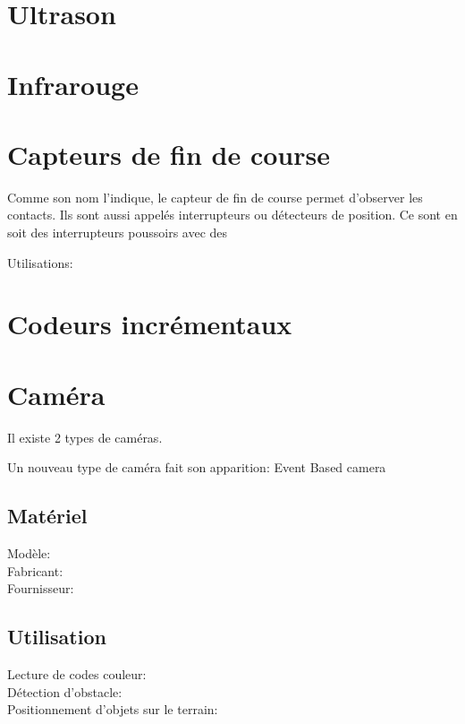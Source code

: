 \documentclass[a4paper, 11pt]{report}
\begin{document}
\section{Ultrason}

\section{Infrarouge}

\section{Capteurs de fin de course}
Comme son nom l'indique, le capteur de fin de course permet d'observer les contacts. Ils sont aussi appelés interrupteurs ou détecteurs de position. Ce sont en soit des interrupteurs poussoirs avec des 

Utilisations:

\section{Codeurs incrémentaux}

\section{Caméra}
Il existe 2 types de caméras.

Un nouveau type de caméra fait son apparition: Event Based camera

\subsection{Matériel}
\begin{description}
\item[Modèle:]
\item[Fabricant:]
\item[Fournisseur:]
\end{description}


\subsection{Utilisation}
\begin{description}
\item[Lecture de codes couleur:]
\item[Détection d'obstacle:]
\item[Positionnement d'objets sur le terrain:]
\end{description}
\end{document}
